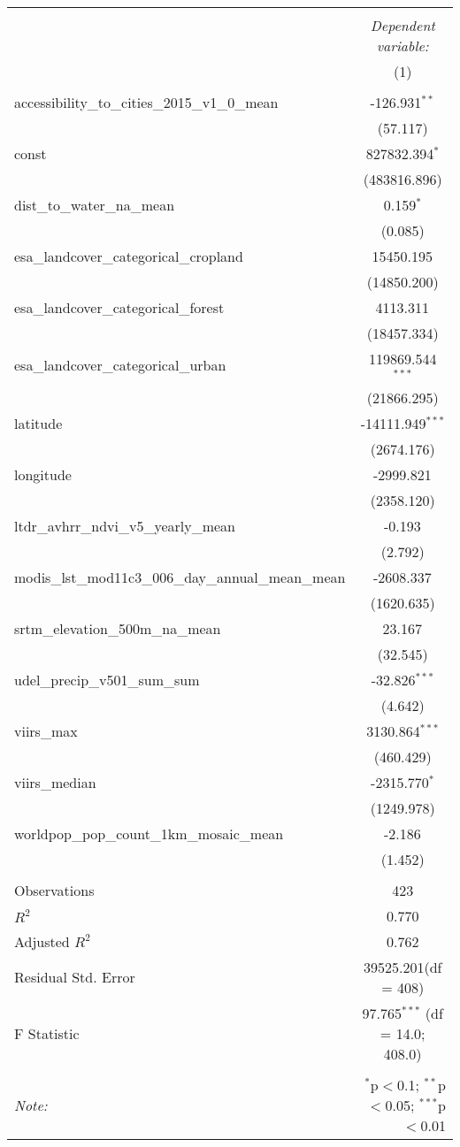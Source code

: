 \begin{table}[!htbp] \centering
\begin{tabular}{@{\extracolsep{5pt}}lc}
\\[-1.8ex]\hline
\hline \\[-1.8ex]
& \multicolumn{1}{c}{\textit{Dependent variable:}} \
\cr \cline{1-2}
\\[-1.8ex] & (1) \\
\hline \\[-1.8ex]
 accessibility_to_cities_2015_v1_0_mean & -126.931$^{**}$ \\
  & (57.117) \\
 const & 827832.394$^{*}$ \\
  & (483816.896) \\
 dist_to_water_na_mean & 0.159$^{*}$ \\
  & (0.085) \\
 esa_landcover_categorical_cropland & 15450.195$^{}$ \\
  & (14850.200) \\
 esa_landcover_categorical_forest & 4113.311$^{}$ \\
  & (18457.334) \\
 esa_landcover_categorical_urban & 119869.544$^{***}$ \\
  & (21866.295) \\
 latitude & -14111.949$^{***}$ \\
  & (2674.176) \\
 longitude & -2999.821$^{}$ \\
  & (2358.120) \\
 ltdr_avhrr_ndvi_v5_yearly_mean & -0.193$^{}$ \\
  & (2.792) \\
 modis_lst_mod11c3_006_day_annual_mean_mean & -2608.337$^{}$ \\
  & (1620.635) \\
 srtm_elevation_500m_na_mean & 23.167$^{}$ \\
  & (32.545) \\
 udel_precip_v501_sum_sum & -32.826$^{***}$ \\
  & (4.642) \\
 viirs_max & 3130.864$^{***}$ \\
  & (460.429) \\
 viirs_median & -2315.770$^{*}$ \\
  & (1249.978) \\
 worldpop_pop_count_1km_mosaic_mean & -2.186$^{}$ \\
  & (1.452) \\
\hline \\[-1.8ex]
 Observations & 423 \\
 $R^2$ & 0.770 \\
 Adjusted $R^2$ & 0.762 \\
 Residual Std. Error & 39525.201(df = 408)  \\
 F Statistic & 97.765$^{***}$ (df = 14.0; 408.0) \\
\hline
\hline \\[-1.8ex]
\textit{Note:} & \multicolumn{1}{r}{$^{*}$p$<$0.1; $^{**}$p$<$0.05; $^{***}$p$<$0.01} \\
\end{tabular}
\end{table}